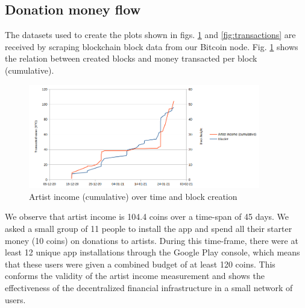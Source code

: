 \subsection{Donation money flow}
The datasets used to create the plots shown in figs. \ref{fig:artist-income} and \ref{fig:transactions} are received by scraping blockchain block data from our Bitcoin node. Fig. \ref{fig:artist-income} shows the relation between created blocks and money transacted per block (cumulative).

\begin{figure}
    \centering
    \includegraphics[width=0.9\textwidth]{evaluation/artist-income.png}
    \caption{Artist income (cumulative) over time and block creation}
    \label{fig:artist-income}
\end{figure}
We observe that artist income is 104.4 coins over a time-span of 45 days. We asked a small group of 11 people to install the app and spend all their starter money (10 coins) on donations to artists. During this time-frame, there were at least 12 unique app installations through the Google Play console, which means that these users were given a combined budget of at least 120 coins. This conforms the validity of the artist income measurement and shows the effectiveness of the decentralized financial infrastructure in a small network of users.


